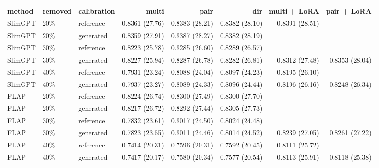 \begin{tabular}{lllrrrrr}
\toprule
method & removed & calibration & multi & pair & dir & multi + LoRA & pair + LoRA \\
\midrule
SlimGPT & 20\% & reference & 0.8361 (27.76) & 0.8383 (28.21) & 0.8382 (28.10) & 0.8391 (28.51) &  \\
SlimGPT & 20\% & generated & 0.8359 (27.91) & 0.8387 (28.27) & 0.8382 (28.19) &  &  \\
SlimGPT & 30\% & reference & 0.8223 (25.78) & 0.8285 (26.60) & 0.8289 (26.57) &  &  \\
SlimGPT & 30\% & generated & 0.8227 (25.94) & 0.8287 (26.78) & 0.8282 (26.81) & 0.8312 (27.48) & 0.8353 (28.04) \\
SlimGPT & 40\% & reference & 0.7931 (23.24) & 0.8088 (24.04) & 0.8097 (24.23) & 0.8195 (26.10) &  \\
SlimGPT & 40\% & generated & 0.7937 (23.27) & 0.8089 (24.33) & 0.8096 (24.44) & 0.8196 (26.16) & 0.8248 (26.34) \\
FLAP & 20\% & reference & 0.8224 (26.74) & 0.8300 (27.49) & 0.8300 (27.70) &  &  \\
FLAP & 20\% & generated & 0.8217 (26.72) & 0.8292 (27.44) & 0.8305 (27.73) &  &  \\
FLAP & 30\% & reference & 0.7832 (23.61) & 0.8017 (24.50) & 0.8024 (24.48) &  &  \\
FLAP & 30\% & generated & 0.7823 (23.55) & 0.8011 (24.46) & 0.8014 (24.52) & 0.8239 (27.05) & 0.8261 (27.22) \\
FLAP & 40\% & reference & 0.7414 (20.31) & 0.7596 (20.31) & 0.7592 (20.45) & 0.8111 (25.72) &  \\
FLAP & 40\% & generated & 0.7417 (20.17) & 0.7580 (20.34) & 0.7577 (20.54) & 0.8113 (25.91) & 0.8118 (25.38) \\
\bottomrule
\end{tabular}
